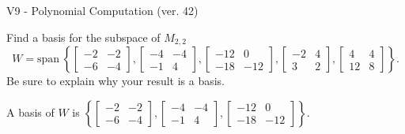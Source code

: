 \begin{exercise}
  \begin{exerciseTitle}V9 - Polynomial Computation (ver. 42)\end{exerciseTitle}
  \begin{exerciseStatement}
    Find a basis for the subspace of \(M_{2,2}\) 
\[W=\mathrm{span}\ \left\{\left[\begin{array}{cc}
-2 & -2 \\
-6 & -4
\end{array}\right] , \left[\begin{array}{cc}
-4 & -4 \\
-1 & 4
\end{array}\right] , \left[\begin{array}{cc}
-12 & 0 \\
-18 & -12
\end{array}\right] , \left[\begin{array}{cc}
-2 & 4 \\
3 & 2
\end{array}\right] , \left[\begin{array}{cc}
4 & 4 \\
12 & 8
\end{array}\right]\right\}.\]
 Be sure to explain why your result is a basis.


  \end{exerciseStatement}
  \begin{exerciseAnswer}
   A basis of \(W\) is  \(\left\{\left[\begin{array}{cc}
-2 & -2 \\
-6 & -4
\end{array}\right] , \left[\begin{array}{cc}
-4 & -4 \\
-1 & 4
\end{array}\right] , \left[\begin{array}{cc}
-12 & 0 \\
-18 & -12
\end{array}\right]\right\}\).
  


  \end{exerciseAnswer}
\end{exercise}